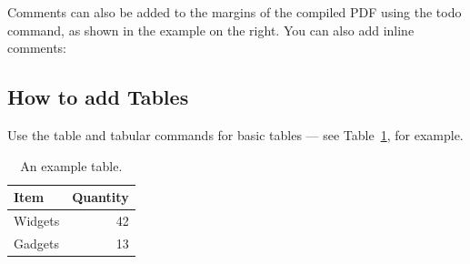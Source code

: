 \documentclass[a4paper]{article}\usepackage[]{graphicx}\usepackage[]{color}
\begin{document}
Comments can also be added to the margins of the compiled PDF using the todo command, as shown in the example on the right. You can also add inline comments:


\subsection{How to add Tables}

Use the table and tabular commands for basic tables --- see Table~\ref{tab:widgets}, for example. 

\begin{table}[h!]
\centering
\begin{tabular}{l|r}
Item & Quantity \\\hline
Widgets & 42 \\
Gadgets & 13
\end{tabular}
\caption{\label{tab:widgets}An example table.}
\end{table}





\end{document}
